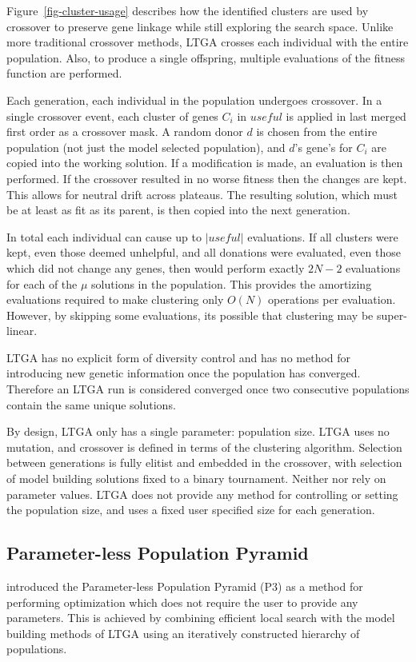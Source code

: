 \documentclass[twoside]{article}
\begin{document}
Figure~\ref{fig-cluster-usage} describes how the identified clusters are used by crossover to preserve
gene linkage while still exploring the search space. Unlike more traditional crossover methods, LTGA
crosses each individual with the entire population. Also, to produce a single offspring, multiple evaluations
of the fitness function are performed.

Each generation, each individual in the population undergoes crossover. In a single crossover event, each
cluster of genes $C_i$ in $useful$ is applied in last merged first order as a crossover mask. A random donor $d$
is chosen from the entire population (not just the model selected population), and $d$'s gene's for $C_i$ are copied
into the working solution. If a modification is made, an evaluation is then performed. If the crossover
resulted in no worse fitness then the changes are kept. This allows for neutral drift across plateaus.
The resulting solution, which must be at least as fit as its parent, is then
copied into the next generation.


In total each individual can cause up to $|useful|$ evaluations. If all clusters were kept, even those deemed
unhelpful, and all donations were evaluated, even those which did not change any genes, then 
would perform exactly $2N-2$ evaluations for each of the $\mu$ solutions in the population. This provides the amortizing evaluations
required to make clustering only $O(N)$ operations per evaluation. However, by skipping some evaluations, its
possible that clustering may be super-linear.

LTGA has no explicit form of diversity control and has no method for introducing new genetic information once
the population has converged. Therefore an LTGA run is considered converged once two consecutive populations
contain the same unique solutions.

By design, LTGA only has a single parameter: population size. LTGA uses no mutation, and crossover is defined
in terms of the clustering algorithm. Selection between generations is fully elitist and embedded in the crossover,
with selection of model building solutions fixed to a binary tournament. Neither  nor
 rely on parameter values. LTGA does not provide any method for controlling or setting
the population size, and uses a fixed user specified size for each generation.

\subsection{Parameter-less Population Pyramid}
\cite{goldman:2014:p3} introduced the Parameter-less Population Pyramid (P3) as a method for
performing optimization which does not require the user to provide any parameters. This is
achieved by combining efficient local search with the model building methods of LTGA using
an iteratively constructed hierarchy of populations.
\end{document}
